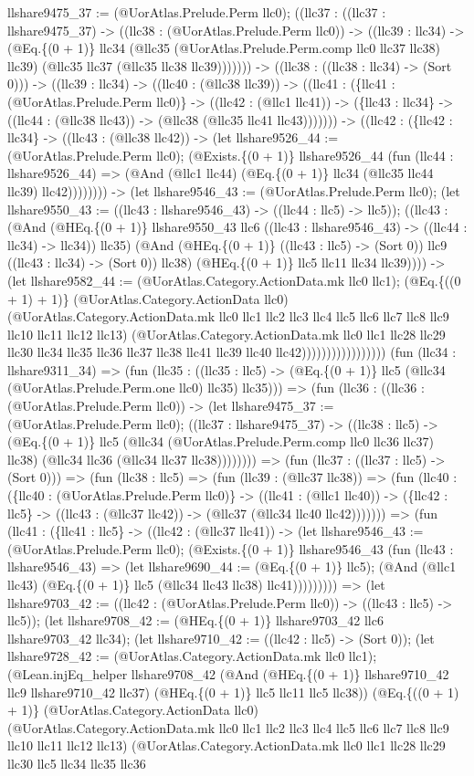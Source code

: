 \documentclass[11pt]{article}
\begin{document}
llshare9475\_37 := (@UorAtlas.Prelude.Perm llc0); ((llc37 : ((llc37 : llshare9475\_37) -> ((llc38 : (@UorAtlas.Prelude.Perm llc0)) -> ((llc39 : llc34) -> (@Eq.\{(0 + 1)\} llc34 (@llc35 (@UorAtlas.Prelude.Perm.comp llc0 llc37 llc38) llc39) (@llc35 llc37 (@llc35 llc38 llc39))))))) -> ((llc38 : ((llc38 : llc34) -> (Sort 0))) -> ((llc39 : llc34) -> ((llc40 : (@llc38 llc39)) -> ((llc41 : (\{llc41 : (@UorAtlas.Prelude.Perm llc0)\} -> ((llc42 : (@llc1 llc41)) -> (\{llc43 : llc34\} -> ((llc44 : (@llc38 llc43)) -> (@llc38 (@llc35 llc41 llc43))))))) -> ((llc42 : (\{llc42 : llc34\} -> ((llc43 : (@llc38 llc42)) -> (let llshare9526\_44 := (@UorAtlas.Prelude.Perm llc0); (@Exists.\{(0 + 1)\} llshare9526\_44 (fun (llc44 : llshare9526\_44) => (@And (@llc1 llc44) (@Eq.\{(0 + 1)\} llc34 (@llc35 llc44 llc39) llc42)))))))) -> (let llshare9546\_43 := (@UorAtlas.Prelude.Perm llc0); (let llshare9550\_43 := ((llc43 : llshare9546\_43) -> ((llc44 : llc5) -> llc5)); ((llc43 : (@And (@HEq.\{(0 + 1)\} llshare9550\_43 llc6 ((llc43 : llshare9546\_43) -> ((llc44 : llc34) -> llc34)) llc35) (@And (@HEq.\{(0 + 1)\} ((llc43 : llc5) -> (Sort 0)) llc9 ((llc43 : llc34) -> (Sort 0)) llc38) (@HEq.\{(0 + 1)\} llc5 llc11 llc34 llc39)))) -> (let llshare9582\_44 := (@UorAtlas.Category.ActionData.mk llc0 llc1); (@Eq.\{((0 + 1) + 1)\} (@UorAtlas.Category.ActionData llc0) (@UorAtlas.Category.ActionData.mk llc0 llc1 llc2 llc3 llc4 llc5 llc6 llc7 llc8 llc9 llc10 llc11 llc12 llc13) (@UorAtlas.Category.ActionData.mk llc0 llc1 llc28 llc29 llc30 llc34 llc35 llc36 llc37 llc38 llc41 llc39 llc40 llc42))))))))))))))))) (fun (llc34 : llshare9311\_34) => (fun (llc35 : ((llc35 : llc5) -> (@Eq.\{(0 + 1)\} llc5 (@llc34 (@UorAtlas.Prelude.Perm.one llc0) llc35) llc35))) => (fun (llc36 : ((llc36 : (@UorAtlas.Prelude.Perm llc0)) -> (let llshare9475\_37 := (@UorAtlas.Prelude.Perm llc0); ((llc37 : llshare9475\_37) -> ((llc38 : llc5) -> (@Eq.\{(0 + 1)\} llc5 (@llc34 (@UorAtlas.Prelude.Perm.comp llc0 llc36 llc37) llc38) (@llc34 llc36 (@llc34 llc37 llc38)))))))) => (fun (llc37 : ((llc37 : llc5) -> (Sort 0))) => (fun (llc38 : llc5) => (fun (llc39 : (@llc37 llc38)) => (fun (llc40 : (\{llc40 : (@UorAtlas.Prelude.Perm llc0)\} -> ((llc41 : (@llc1 llc40)) -> (\{llc42 : llc5\} -> ((llc43 : (@llc37 llc42)) -> (@llc37 (@llc34 llc40 llc42))))))) => (fun (llc41 : (\{llc41 : llc5\} -> ((llc42 : (@llc37 llc41)) -> (let llshare9546\_43 := (@UorAtlas.Prelude.Perm llc0); (@Exists.\{(0 + 1)\} llshare9546\_43 (fun (llc43 : llshare9546\_43) => (let llshare9690\_44 := (@Eq.\{(0 + 1)\} llc5); (@And (@llc1 llc43) (@Eq.\{(0 + 1)\} llc5 (@llc34 llc43 llc38) llc41))))))))) => (let llshare9703\_42 := ((llc42 : (@UorAtlas.Prelude.Perm llc0)) -> ((llc43 : llc5) -> llc5)); (let llshare9708\_42 := (@HEq.\{(0 + 1)\} llshare9703\_42 llc6 llshare9703\_42 llc34); (let llshare9710\_42 := ((llc42 : llc5) -> (Sort 0)); (let llshare9728\_42 := (@UorAtlas.Category.ActionData.mk llc0 llc1); (@Lean.injEq\_helper llshare9708\_42 (@And (@HEq.\{(0 + 1)\} llshare9710\_42 llc9 llshare9710\_42 llc37) (@HEq.\{(0 + 1)\} llc5 llc11 llc5 llc38)) (@Eq.\{((0 + 1) + 1)\} (@UorAtlas.Category.ActionData llc0) (@UorAtlas.Category.ActionData.mk llc0 llc1 llc2 llc3 llc4 llc5 llc6 llc7 llc8 llc9 llc10 llc11 llc12 llc13) (@UorAtlas.Category.ActionData.mk llc0 llc1 llc28 llc29 llc30 llc5 llc34 llc35 llc36 
\end{document}
